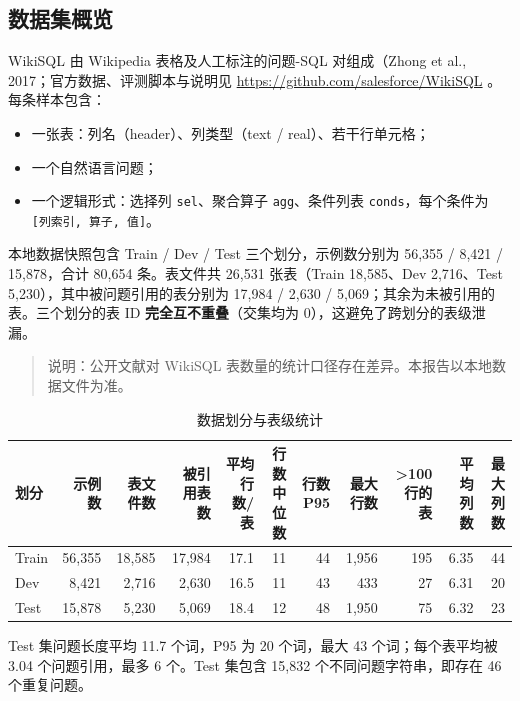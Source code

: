 \documentclass[conference]{IEEEtran}
\begin{document}
\subsection{数据集概览}
WikiSQL 由 Wikipedia 表格及人工标注的问题-SQL 对组成（Zhong et al., 2017；官方数据、评测脚本与说明见 \url{https://github.com/salesforce/WikiSQL} 。每条样本包含：
\begin{itemize}
\item 一张表：列名（header）、列类型（text / real）、若干行单元格；
\item 一个自然语言问题；
\item 一个逻辑形式：选择列 \texttt{sel}、聚合算子 \texttt{agg}、条件列表 \texttt{conds}，每个条件为 \texttt{[列索引, 算子, 值]}。
\end{itemize}
本地数据快照包含 Train / Dev / Test 三个划分，示例数分别为 56,355 / 8,421 / 15,878，合计 80,654 条。表文件共 26,531 张表（Train 18,585、Dev 2,716、Test 5,230），其中被问题引用的表分别为 17,984 / 2,630 / 5,069；其余为未被引用的表。三个划分的表 ID \textbf{完全互不重叠}（交集均为 0），这避免了跨划分的表级泄漏。
\begin{quote}\small
说明：公开文献对 WikiSQL 表数量的统计口径存在差异。本报告以本地数据文件为准。
\end{quote}
\begin{table}[t]
\centering
\footnotesize
\caption{数据划分与表级统计}
\label{tab:t1}
\begin{tabular}{@{}lrrrrrrrrrr@{}}
\toprule
划分 & 示例数 & 表文件数 & 被引用表数 & 平均行数/表 & 行数中位数 & 行数 P95 & 最大行数 & \textgreater{}100 行的表 & 平均列数 & 最大列数 \\
\midrule
Train & 56,355 & 18,585 & 17,984 & 17.1 & 11 & 44 & 1,956 & 195 & 6.35 & 44 \\
Dev & 8,421 & 2,716 & 2,630 & 16.5 & 11 & 43 & 433 & 27 & 6.31 & 20 \\
Test & 15,878 & 5,230 & 5,069 & 18.4 & 12 & 48 & 1,950 & 75 & 6.32 & 23 \\
\bottomrule
\end{tabular}
\end{table}
Test 集问题长度平均 11.7 个词，P95 为 20 个词，最大 43 个词；每个表平均被 3.04 个问题引用，最多 6 个。Test 集包含 15,832 个不同问题字符串，即存在 46 个重复问题。
\end{document}
